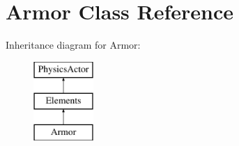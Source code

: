 \hypertarget{class_armor}{\section{Armor Class Reference}
\label{class_armor}
}
Inheritance diagram for Armor\+:\begin{figure}[H]
\begin{center}
\leavevmode
\includegraphics[height=3.000000cm]{class_armor}
\end{center}
\end{figure}
